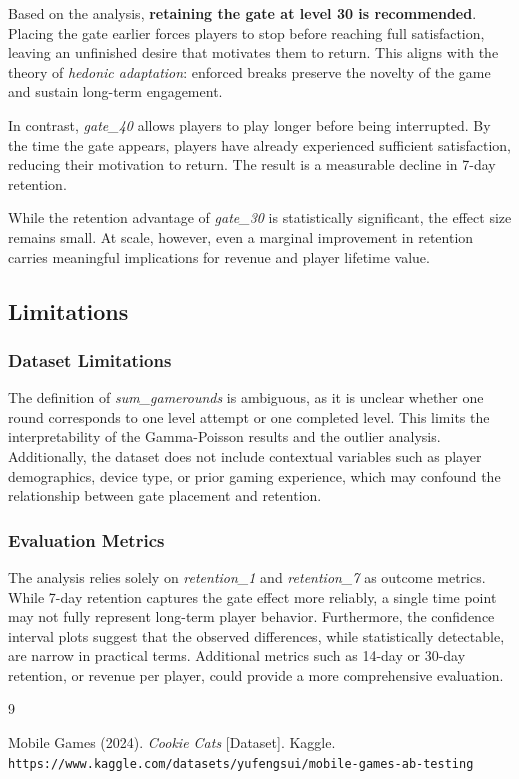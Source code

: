 \documentclass[12pt]{article}
\begin{document}
Based on the analysis, \textbf{retaining the gate at level 30 is recommended}. 
Placing the gate earlier forces players to stop before reaching full satisfaction, 
leaving an unfinished desire that motivates them to return. This aligns with the 
theory of \textit{hedonic adaptation}: enforced breaks preserve the novelty of the 
game and sustain long-term engagement.

In contrast, \textit{gate\_40} allows players to play longer before being interrupted. 
By the time the gate appears, players have already experienced sufficient satisfaction, 
reducing their motivation to return. The result is a measurable decline in 7-day 
retention.

While the retention advantage of \textit{gate\_30} is statistically significant, 
the effect size remains small. At scale, however, even a marginal improvement in 
retention carries meaningful implications for revenue and player lifetime value.

\subsection{Limitations}

\subsubsection*{Dataset Limitations}
The definition of \textit{sum\_gamerounds} is ambiguous, as it is unclear whether 
one round corresponds to one level attempt or one completed level. This limits 
the interpretability of the Gamma-Poisson results and the outlier analysis. 
Additionally, the dataset does not include contextual variables such as player 
demographics, device type, or prior gaming experience, which may confound the 
relationship between gate placement and retention.

\subsubsection*{Evaluation Metrics}
The analysis relies solely on \textit{retention\_1} and \textit{retention\_7} as 
outcome metrics. While 7-day retention captures the gate effect more reliably, 
a single time point may not fully represent long-term player behavior. Furthermore, 
the confidence interval plots suggest that the observed differences, while 
statistically detectable, are narrow in practical terms. Additional metrics such 
as 14-day or 30-day retention, or revenue per player, could provide a more 
comprehensive evaluation.

\begin{thebibliography}{9}

Mobile Games (2024).
\textit{Cookie Cats} [Dataset].
Kaggle.
\texttt{https://www.kaggle.com/datasets/yufengsui/mobile-games-ab-testing}

\end{thebibliography}
\end{document}
